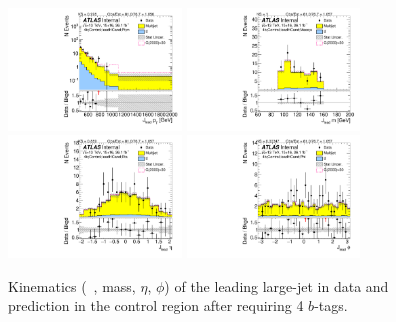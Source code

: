 \begin{figure}[htb!]
\begin{center}
\includegraphics[width=0.41\textwidth,angle=-90]{figures/boosted/Control/b77_FourTag_Control_leadHCand_Pt_m_1.pdf}
\includegraphics[width=0.41\textwidth,angle=-90]{figures/boosted/Control/b77_FourTag_Control_leadHCand_Mass_s.pdf}\\
\includegraphics[width=0.41\textwidth,angle=-90]{figures/boosted/Control/b77_FourTag_Control_leadHCand_Eta.pdf}
\includegraphics[width=0.41\textwidth,angle=-90]{figures/boosted/Control/b77_FourTag_Control_leadHCand_Phi.pdf}
  \caption{Kinematics (\pt~, mass, $\eta$, $\phi$) of the leading large-\R jet in data and prediction in the control region after requiring 4 $b$-tags. }
  \label{fig:boosted-4b-control-ak10-lead}
\end{center}
\end{figure}

